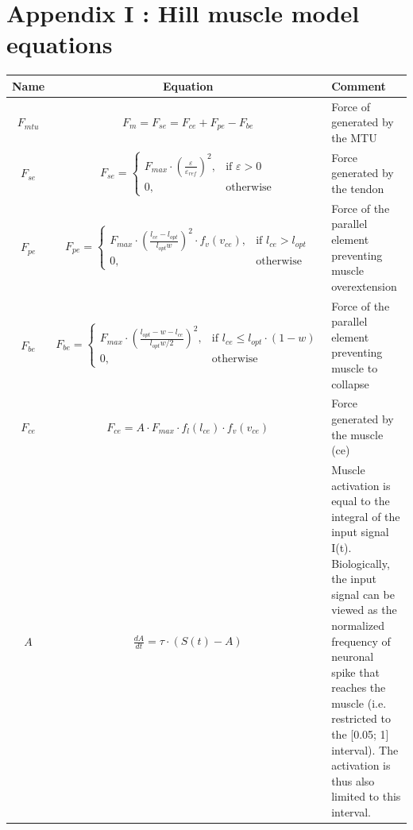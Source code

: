 \documentclass{cmc}
\begin{document}
\section*{Appendix I : Hill muscle model equations}
\label{sec:hill-model-equations}
\begin{table}[H]
  \centering
  \begin{tabular}{c|c|p{7cm}}
    \textbf{Name}& \textbf{Equation}& \textbf{Comment} \\ \hline
    $F_{mtu}$ & $F_{m} = F_{se} = F_{ce}+F_{pe}-F_{be}$ & Force of generated by the MTU \\[0.7cm]
    $F_{se}$ & $
               F_{se}=
               \begin{cases}
                 F_{max} \cdot (\frac{\varepsilon}{\varepsilon_{ref}})^2,& \text{if } \varepsilon > 0 \\
                 0, & \text{otherwise}
               \end{cases}
                      $  & Force generated by the tendon \\[0.7cm]
    $F_{pe}$ & $
               F_{pe}=
               \begin{cases}
                 F_{max} \cdot (\frac{l_{ce}-l_{opt}}{l_{opt}w})^2\cdot f_{v}(v_{ce}),& \text{if } l_{ce} > l_{opt} \\
                 0, & \text{otherwise}
               \end{cases}
                      $
                                    & Force of the parallel element preventing muscle overextension \\[0.7cm]
    $F_{be}$ & $
               F_{be}=
               \begin{cases}
                 F_{max} \cdot (\frac{l_{opt}-w-l_{ce}}{l_{opt}w/2})^2,& \text{if } l_{ce} \leq l_{opt}\cdot(1 - w) \\
                 0, & \text{otherwise}
               \end{cases}
                      $
                                    & Force of the parallel element preventing muscle to collapse
    \\[0.7cm]

    $F_{ce}$ & $F_{ce} = A \cdot F_{max} \cdot f_l(l_{ce}) \cdot f_v(v_{ce})$ & Force generated by the muscle (ce) \\ [0.7cm]

    $A$ & $\frac{dA}{dt} = \tau \cdot (S(t) - A)$ & Muscle activation is equal to the integral of the input signal I(t). Biologically, the input signal can be viewed as the normalized frequency of neuronal spike that reaches the muscle (i.e. restricted to the [0.05; 1] interval). The activation is thus also limited to this interval. \\[0.7cm]


\end{tabular}
\end{table}
\end{document}
